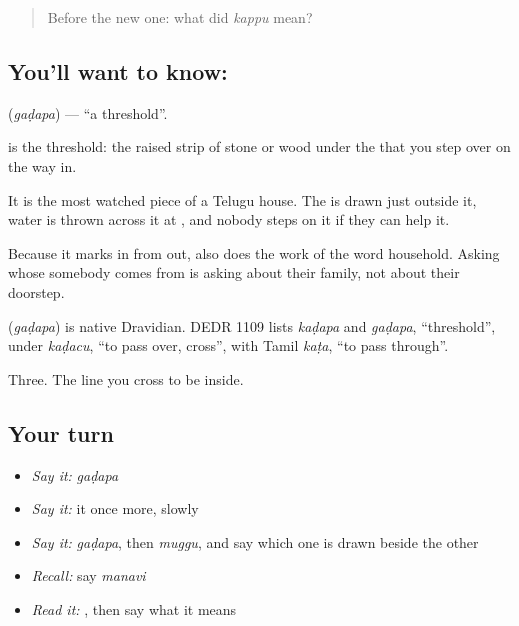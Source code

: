 \label{lesson:TE-C67-threshold}



\begin{quote}
Before the new one: what did \emph{kappu} mean?
\end{quote}

\subsection*{You'll want to know: }
\textbf{} (\emph{gaḍapa}) — \textquotedblleft{}a threshold\textquotedblright{}.

 is the threshold: the raised strip of stone or wood under the  that you step over on the way in.

It is the most watched piece of a Telugu house. The  is drawn just outside it, water is thrown across it at , and nobody steps on it if they can help it.

Because it marks in from out,  also does the work of the word household. Asking whose  somebody comes from is asking about their family, not about their doorstep.

\begin{cousinweb}
\textbf{} (\emph{gaḍapa}) is native Dravidian. DEDR 1109 lists \emph{kaḍapa} and \emph{gaḍapa}, \textquotedblleft{}threshold\textquotedblright{}, under \emph{kaḍacu}, \textquotedblleft{}to pass over, cross\textquotedblright{}, with Tamil \emph{kaṭa}, \textquotedblleft{}to pass through\textquotedblright{}.
\end{cousinweb}

\begin{grammarlens}[title={What you've built}]
Three. The line you cross to be inside.
\end{grammarlens}

\subsection*{Your turn}
\begin{itemize}
\raggedright
  \item \emph{Say it:} \emph{gaḍapa}
  \item \emph{Say it:} it once more, slowly
  \item \emph{Say it:} \emph{gaḍapa}, then \emph{muggu}, and say which one is drawn beside the other
  \item \emph{Recall:} say \emph{manavi}
  \item \emph{Read it:} \textbf{}, then say what it means
\end{itemize}


